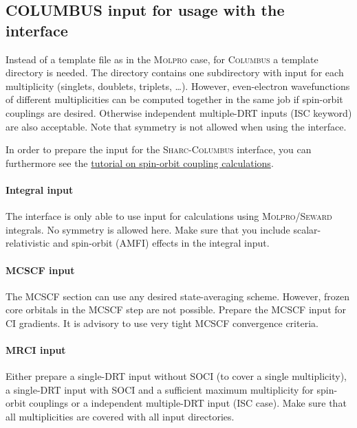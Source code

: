 \documentclass[a4paper,11pt,DIV=15,openany]{scrbook}
\newcommand{\sharc}{\textsc{Sharc}}
\begin{document}
\subsection{COLUMBUS input for usage with the interface}

Instead of a template file as in the \textsc{Molpro} case, for \textsc{Columbus} a template directory is needed.
The directory contains one subdirectory with input for each multiplicity (singlets, doublets, triplets, \dots). However, even-electron wavefunctions of different multiplicities can be computed together in the same job if spin-orbit couplings are desired. Otherwise independent multiple-DRT inputs (ISC keyword) are also acceptable. Note that symmetry is not allowed when using the interface.

In order to prepare the input for the \sharc-\textsc{Columbus} interface, you can furthermore see the 
\href{http://www.univie.ac.at/columbus/docs_COL70/tutorial-SO.pdf}{tutorial on spin-orbit coupling calculations}.

\paragraph{Integral input}

The interface is only able to use input for calculations using \textsc{Molpro/Seward} integrals. No symmetry is allowed here. Make sure that you include scalar-relativistic and spin-orbit (AMFI) effects in the integral input. 

\paragraph{MCSCF input}

The MCSCF section can use any desired state-averaging scheme. However, frozen core orbitals in the MCSCF step are not possible. Prepare the MCSCF input for CI gradients. It is advisory to use very tight MCSCF convergence criteria.

\paragraph{MRCI input}

Either prepare a single-DRT input without SOCI (to cover a single multiplicity), a single-DRT input with SOCI and a sufficient maximum multiplicity for spin-orbit couplings or a independent multiple-DRT input (ISC case). Make sure that all multiplicities are covered with all input directories.
\end{document}
